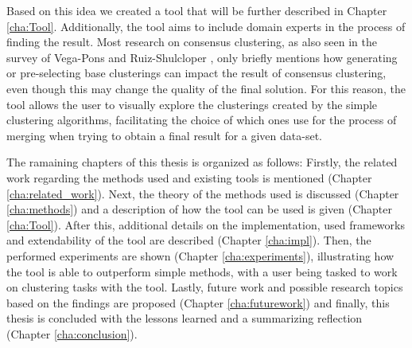 Based on this idea we created a tool that will be further described in Chapter \ref{cha:Tool}. Additionally, the tool aims to include domain experts in the process of finding the result. Most research on consensus clustering, as also seen in the survey of Vega-Pons and Ruiz-Shulcloper \cite{survey1}, only briefly mentions how generating or pre-selecting base clusterings can impact the result of consensus clustering, even though this may change the quality of the final solution. For this reason, the tool allows the user to visually explore the clusterings created by the simple clustering algorithms, facilitating the choice of which ones use for the process of merging when trying to obtain a final result for a given data-set.

The ramaining chapters of this thesis is organized as follows: Firstly, the related work regarding the methods used and existing tools is mentioned (Chapter \ref{cha:related_work}). Next, the theory of the methods used is discussed (Chapter \ref{cha:methods}) and a description of how the tool can be used is given (Chapter \ref{cha:Tool}). After this, additional details on the implementation, used frameworks and extendability of the tool are described (Chapter \ref{cha:impl}). Then, the performed experiments are shown (Chapter \ref{cha:experiments}), illustrating how the tool is able to outperform simple methods, with a user being tasked to work on clustering tasks with the tool. Lastly, future work and possible research topics based on the findings are proposed (Chapter \ref{cha:futurework}) and finally, this thesis is concluded with the lessons learned and a summarizing reflection (Chapter \ref{cha:conclusion}).
